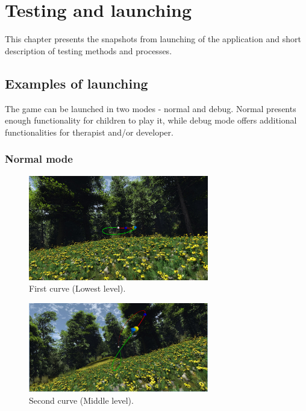 \chapter{Testing and launching}
\label{testing}

This chapter presents the snapshots from launching of the application and short description of testing methods and processes. 

\section{Examples of launching}
The game can be launched in two modes - normal and debug. Normal presents enough functionality for children to play it, while debug mode offers additional functionalities for therapist and/or developer. 
\subsection{Normal mode}
\begin{figure} [h]
\begin{center}
\includegraphics[width=0.7\textwidth]{Images/first_curve}
\end{center}
\caption{First curve (Lowest level).}
\label{fig:first_curve}
\end{figure}

\begin{figure}
\begin{center}
\includegraphics[width=0.7\textwidth]{Images/second_curve}%
\end{center}
\caption{Second curve (Middle level).}
\label{fig:second_curve}
\end{figure}

